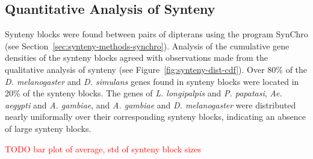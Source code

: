 \subsection{Quantitative Analysis of Synteny}
Synteny blocks were found between pairs of dipterans using the program SynChro (see Section~\ref{sec:synteny-methods-synchro}). Analysis of the cumulative gene densities of the synteny blocks agreed with observations made from the qualitative analysis of synteny (see Figure~\ref{fig:synteny-dist-cdf}).  Over 80\% of the \emph{D. melanogaster} and \emph{D. simulans} genes found in synteny blocks were located in 20\% of the synteny blocks.  The genes of \emph{L. longipalpis} and \emph{P. papatasi}, \emph{Ae. aegypti} and \emph{A. gambiae}, and \emph{A. gambiae} and \emph{D. melanogaster} were distributed nearly uniformally over their corresponding synteny blocks, indicating an absence of large synteny blocks.

\textcolor{red}{TODO bar plot of average, std of synteny block sizes}

